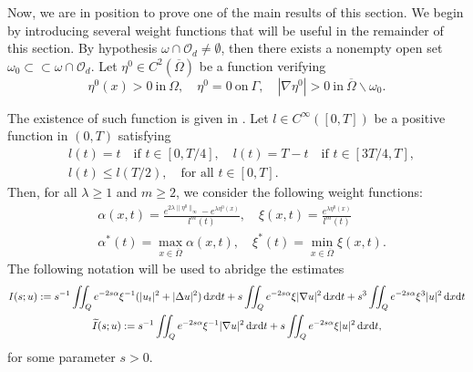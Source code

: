 \documentclass[preprint,10pt]{article}
\numberwithin{equation}{section}
\numberwithin{theorem}{section}
\def\dx{\,\textnormal{d}x}
\def\dt{\textnormal{d}t}
\def\dx{\,\textnormal{d}x}
\def\dt{\textnormal{d}t}
\begin{document}
{Now, we are in position to prove one of the main results of this section. We begin by introducing several weight functions that will be useful in the remainder of this section. By hypothesis $\omega\cap\mathcal O_d\neq \emptyset$, then there exists a nonempty open set $\omega_0\subset\subset\omega\cap\mathcal O_d$. Let $\eta^0\in C^2(\overline\Omega)$ be a function verifying
%
\begin{equation}\label{constr_1}
\eta^0(x)>0 \ \text{in} \ \Omega, \quad \eta^0=0 \ \text{on} \ \Gamma, \quad |\nabla\eta^0|>0 \ \text{in} \ \overline{\Omega}\backslash\omega_0.
\end{equation}
%

The existence of such function is given in \cite{fursi}. Let $l\in C^\infty([0,T])$ be a positive function in $(0,T)$ satisfying 
%
\begin{equation*}
\begin{split}
&l(t)=t \quad \text{if } t\in [0,T/4], \quad l(t)=T-t \quad \text{if } t\in [3T/4,T], \\
&l(t)\leq l(T/2), \quad \text{for all } t\in[0,T]. 
\end{split}
\end{equation*}
%
Then, for all $\lambda\geq 1$ and $m\geq 2$, we consider the following weight functions:
%
\begin{equation}\label{weights_l} 
\begin{split}
&\alpha(x,t)= \frac{e^{2\lambda\|\eta^0\|_\infty}-e^{\lambda\eta^0(x)}}{l^m(t)}, \quad \xi(x,t)=\frac{e^{\lambda \eta^0(x)}}{l^m(t)} \\
&\alpha^*(t)=\max_{x\in\overline{\Omega}}\alpha(x,t), \quad \xi^*(t)=\min_{x\in\overline\Omega} \xi(x,t).
\end{split}
\end{equation}
%
The following notation will be used to abridge the estimates
%
\begin{equation*} 
\begin{gathered}
I(s;u):=s^{-1}\iint_{Q}e^{-2s\alpha}\xi^{-1}(|u_t|^2+|\Delta u|^2)\dx\dt+s\iint_Qe^{-2s\alpha}\xi|\nabla u|^2\dx\dt+s^3\iint_Qe^{-2s\alpha}\xi^3|u|^2\dx\dt \\
\widetilde I(s;u):=s^{-1}\iint_{Q}e^{-2s\alpha}\xi^{-1}|\nabla u|^2\dx\dt+s\iint_{Q}e^{-2s\alpha}\xi |u|^2\dx\dt,
\end{gathered}
\end{equation*}
%
for some parameter $s>0$. 

}
\end{document}
